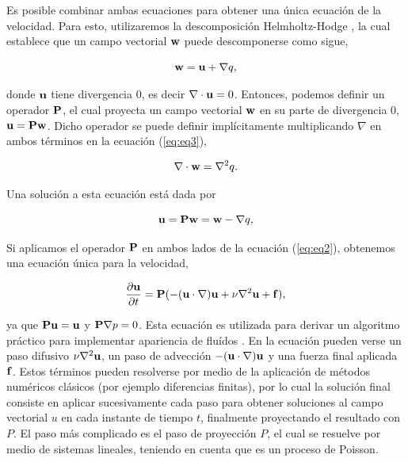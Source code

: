 Es posible combinar ambas ecuaciones para obtener una única ecuación de la velocidad.
Para esto, utilizaremos la descomposición Helmholtz-Hodge \cite{Chorin1990}, la cual establece que un campo vectorial $\bold{w}$ puede descomponerse como sigue, 

\begin{equation}
\label{eq:eq3}
\bold{w} = \bold{u} + \nabla q,
\end{equation}

donde $\bold{u}$ tiene divergencia $0$, es decir $\nabla\cdot\bold{u} = 0$.
Entonces, podemos definir un operador $\bold{P}$, el cual proyecta un campo vectorial $\bold{w}$ en su parte de divergencia $0$, $\bold{u} = \bold{P}\bold{w}$.
Dicho operador se puede definir implícitamente multiplicando $\nabla$ en ambos términos en la ecuación (\ref{eq:eq3}),

\begin{equation}
\label{eq:eq4}
\nabla\cdot\bold{w} = \nabla^{2} q.
\end{equation}

Una solución a esta ecuación está dada por

\begin{equation}
\label{eq:eq5}
\bold{u} = \bold{P}\bold{w} = \bold{w} - \nabla q,
\end{equation}

Si aplicamos el operador $\bold{P}$ en ambos lados de la ecuación (\ref{eq:eq2}), obtenemos una ecuación única para la velocidad,

\begin{equation}
\frac{\partial \bold{u} }{\partial t} = \bold{P} (- (\bold{u} \cdot \nabla) \bold{u} + \nu \nabla^{2} \bold{u} + \bold{f}) \label{eq:eq6},
\end{equation}

ya que $\bold{P}\bold{u} = \bold{u}$ y $\bold{P}\nabla p = 0$.
Esta ecuación es utilizada para derivar un algoritmo práctico para implementar apariencia de fluídos \cite{Stam1999}.
En la ecuación pueden verse un paso difusivo $\nu \nabla^{2} \bold{u}$, un paso de advección $- (\bold{u} \cdot \nabla) \bold{u}$ y una fuerza final aplicada $\bold{f}$.
Estos términos pueden resolverse por medio de la aplicación de métodos numéricos clásicos (por ejemplo diferencias finitas), por lo cual la solución final consiste en aplicar sucesivamente cada paso para obtener soluciones al campo vectorial $u$ en cada instante de tiempo $t$, finalmente proyectando el resultado con $P$.
El paso más complicado es el paso de proyección $P$, el cual se resuelve por medio de sistemas lineales, teniendo en cuenta que es un proceso de Poisson.

